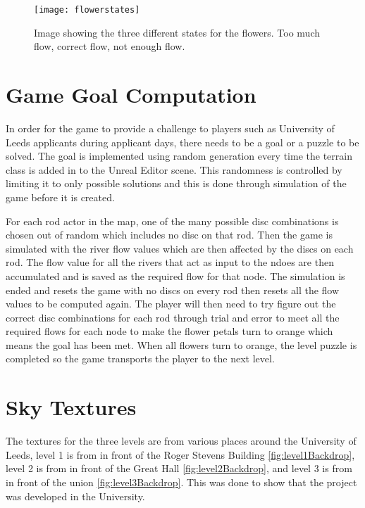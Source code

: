 \begin{figure}[h]
	\texttt{[image: flowerstates]}
	\centering
	\caption{Image showing the three different states for the flowers. Too much flow, correct flow, not enough flow.}
	\label{fig:flowerstates}
\end{figure}

\section{Game Goal Computation}
In order for the game to provide a challenge to players such as University of Leeds applicants during applicant days, there needs to be a goal or a puzzle to be solved. The goal is implemented using random generation every time the terrain class is added in to the Unreal Editor scene. This randomness is controlled by limiting it to only possible solutions and this is done through simulation of the game before it is created.
\newline
\par
For each rod actor in the map, one of the many possible disc combinations is chosen out of random which includes no disc on that rod. Then the game is simulated with the river flow values which are then affected by the discs on each rod. The flow value for all the rivers that act as input to the ndoes are then accumulated and is saved as the required flow for that node. The simulation is ended and resets the game with no discs on every rod then resets all the flow values to be computed again. The player will then need to try figure out the correct disc combinations for each rod through trial and error to meet all the required flows for each node to make the flower petals turn to orange which means the goal has been met. When all flowers turn to orange, the level puzzle is completed so the game transports the player to the next level.

\section{Sky Textures}
The textures for the three levels are from various places around the University of Leeds, level 1 is from in front of the Roger Stevens Building \ref{fig:level1Backdrop}, level 2 is from in front of the Great Hall \ref{fig:level2Backdrop}, and level 3 is from in front of the union \ref{fig:level3Backdrop}. This was done to show that the project was developed in the University.

\clearpage

